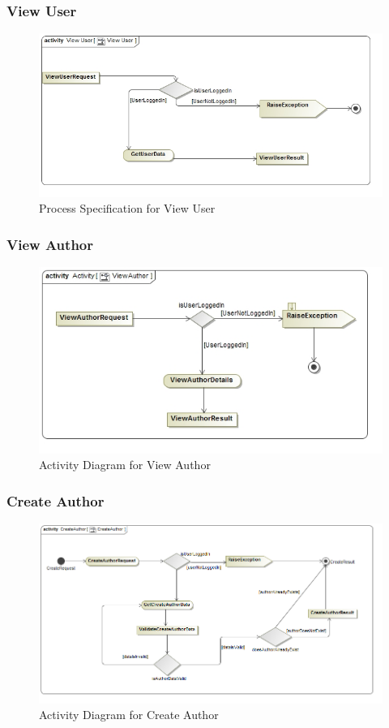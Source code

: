 \documentclass[a4paper,10pt]{article}
\begin{document}
\subsubsection{View User}
	\begin{figure}[h]
	\includegraphics[scale=0.5]{ActViewUser}
	\caption{Process Specification for View User}
	\end{figure}
	
\subsubsection{View Author}
	\begin{figure}[h]
		\includegraphics[scale=0.5]{ActViewAuthor}
		\caption{Activity Diagram for View Author}
	\end{figure}

\subsubsection{Create Author}
	\begin{figure}[h]
		\includegraphics[scale=0.5]{Activity_CreateAuthor}
		\caption{Activity Diagram for Create Author}
	\end{figure}
\end{document}
